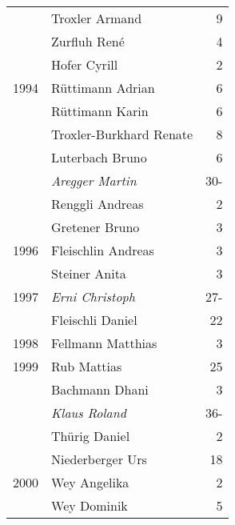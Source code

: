 {\begin{longtable}{ l l r }
                      & Troxler Armand                            & 9           \\
                      & Zurfluh René                              & 4           \\
                      & Hofer Cyrill                              & 2           \\
        1994          & Rüttimann Adrian                          & 6           \\
                      & Rüttimann Karin                           & 6           \\
                      & Troxler-Burkhard Renate                   & 8           \\
                      & Luterbach Bruno                           & 6           \\
                      & \emph{Aregger Martin}                     & 30-         \\
                      & Renggli Andreas                           & 2           \\
                      & Gretener Bruno                            & 3           \\
        1996          & Fleischlin Andreas                        & 3           \\
                      & Steiner Anita                             & 3           \\
        1997          & \emph{Erni Christoph}                     & 27-         \\
                      & Fleischli Daniel                          & 22          \\
        1998          & Fellmann Matthias                         & 3           \\
        1999          & Rub Mattias                               & 25          \\
                      & Bachmann Dhani                            & 3           \\
                      & \emph{Klaus Roland}                       & 36-         \\
                      & Thürig Daniel                             & 2           \\
                      & Niederberger Urs                          & 18          \\
        2000          & Wey Angelika                              & 2           \\
                      & Wey Dominik                               & 5           \\

\end{longtable}}
